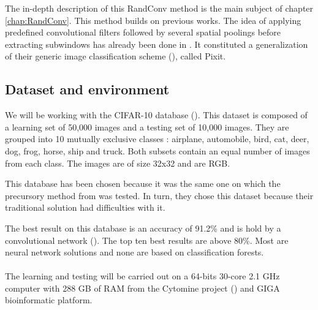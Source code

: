\documentclass[a4paper]{report}
\begin{document}
	
The in-depth description of this RandConv method is the main subject of chapter \ref{chap:RandConv}.
	This method builds on previous works. The idea of applying predefined convolutional filters followed by several spatial poolings before extracting subwindows has already been done in \cite{base}. It constituted a generalization of their generic image classification scheme (\cite{pixit}), called Pixit. 
	
	
	\subsection{Dataset and environment} %
	We will be working with the CIFAR-10 database (\cite{cifar}). This dataset is composed of a learning set of 50,000 images and a testing set of 10,000 images. They are grouped into 10 mutually exclusive classes : airplane, automobile, bird, cat, deer, dog, frog, horse, ship and truck. Both subsets contain an equal number of images from each class. The images are of size 32x32 and are RGB.
	\par
	This database has been chosen because it was the same one on which the precursory method from \cite{base} was tested. In turn, they chose this dataset because their traditional solution had difficulties with it. 
	\par
	The best result on this database is an accuracy of 91.2\% and is hold by a convolutional network (\cite{bestcifar}). The top ten best results are above 80\%. Most are neural network solutions and none are based on classification forests.
	\paragraph{}
	The learning and testing will be carried out on a 64-bits 30-core 2.1 GHz computer with 288 GB of RAM from the Cytomine project (\cite{cytomine}) and GIGA bioinformatic platform.
	
	
\end{document}
